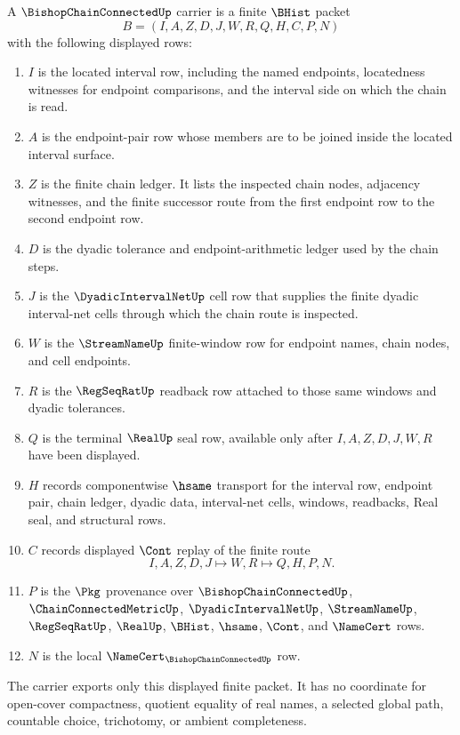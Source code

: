 \begin{definition}
\label{def:bishop-chain-connected-carrier}
A $\BishopChainConnectedUp$ carrier is a finite $\BHist$ packet
$$
B=(I,A,Z,D,J,W,R,Q,H,C,P,N)
$$
with the following displayed rows:
\begin{enumerate}
\item $I$ is the located interval row, including the named endpoints, locatedness witnesses for endpoint comparisons, and the interval side on which the chain is read.
\item $A$ is the endpoint-pair row whose members are to be joined inside the located interval surface.
\item $Z$ is the finite chain ledger. It lists the inspected chain nodes, adjacency witnesses, and the finite successor route from the first endpoint row to the second endpoint row.
\item $D$ is the dyadic tolerance and endpoint-arithmetic ledger used by the chain steps.
\item $J$ is the $\DyadicIntervalNetUp$ cell row that supplies the finite dyadic interval-net cells through which the chain route is inspected.
\item $W$ is the $\StreamNameUp$ finite-window row for endpoint names, chain nodes, and cell endpoints.
\item $R$ is the $\RegSeqRatUp$ readback row attached to those same windows and dyadic tolerances.
\item $Q$ is the terminal $\RealUp$ seal row, available only after $I,A,Z,D,J,W,R$ have been displayed.
\item $H$ records componentwise $\hsame$ transport for the interval row, endpoint pair, chain ledger, dyadic data, interval-net cells, windows, readbacks, Real seal, and structural rows.
\item $C$ records displayed $\Cont$ replay of the finite route
$$
I,A,Z,D,J \longmapsto W,R \longmapsto Q,H,P,N .
$$
\item $P$ is the $\Pkg$ provenance over $\BishopChainConnectedUp$, $\ChainConnectedMetricUp$, $\DyadicIntervalNetUp$, $\StreamNameUp$, $\RegSeqRatUp$, $\RealUp$, $\BHist$, $\hsame$, $\Cont$, and $\NameCert$ rows.
\item $N$ is the local $\NameCert_{\BishopChainConnectedUp}$ row.
\end{enumerate}
The carrier exports only this displayed finite packet. It has no coordinate for open-cover compactness, quotient equality of real names, a selected global path, countable choice, trichotomy, or ambient completeness.
\end{definition}

